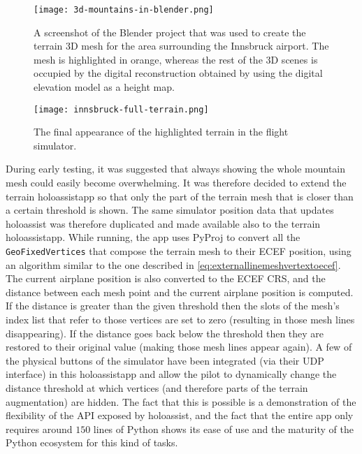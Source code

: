 \begin{figure}
  \centering
  \texttt{[image: 3d-mountains-in-blender.png]}
  \caption{A screenshot of the Blender project that was used to create the terrain 3D mesh for the area surrounding the Innsbruck airport. The mesh is highlighted in orange, whereas the rest of the 3D scenes is occupied by the digital reconstruction obtained by using the digital elevation model as a height map.}\label{fig:mountains_wire_mesh.png}
\end{figure}

\begin{figure}
  \centering
  \texttt{[image: innsbruck-full-terrain.png]}
  \caption{The final appearance of the highlighted terrain in the flight simulator.}\label{fig:lowi_full_terrain.png}
\end{figure}

During early testing, it was suggested that always showing the whole mountain mesh could easily become overwhelming. It was therefore decided to extend the terrain \gls{holoassistapp} so that only the part of the terrain mesh that is closer than a certain threshold is shown. The same simulator position data that updates \gls{holoassist} was therefore duplicated and made available also to the terrain \gls{holoassistapp}. While running, the app uses PyProj to convert all the \texttt{GeoFixedVertices} that compose the terrain mesh to their \gls{ECEF} position, using an algorithm similar to the one described in \autoref{eq:externallinemeshvertextoecef}. The current airplane position is also converted to the \gls{ECEF} \gls{CRS}, and the distance between each mesh point and the current airplane position is computed. If the distance is greater than the given threshold then the slots of the mesh's index list that refer to those vertices are set to zero (resulting in those mesh lines disappearing). If the distance goes back below the threshold then they are restored to their original value (making those mesh lines appear again). A few of the physical buttons of the simulator have been integrated (via their \gls{UDP} interface) in this \gls{holoassistapp} and allow the pilot to dynamically change the distance threshold at which vertices (and therefore parts of the terrain augmentation) are hidden. The fact that this is possible is a demonstration of the flexibility of the \gls{API} exposed by \gls{holoassist}, and the fact that the entire app only requires around $150$ lines of Python shows its ease of use and the maturity of the Python ecosystem for this kind of tasks.

